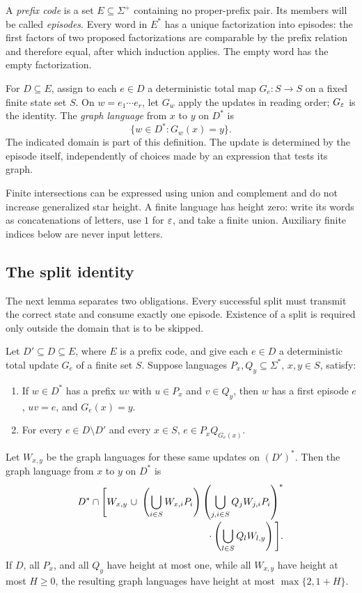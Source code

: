A \emph{prefix code} is a set $E\subseteq\Sigma^+$ containing no
proper-prefix pair. Its members will be called \emph{episodes}. Every
word in $E^*$ has a unique factorization into episodes: the first factors
of two proposed factorizations are comparable by the prefix relation and
therefore equal, after which induction applies. The empty word has the
empty factorization.

For $D\subseteq E$, assign to each $e\in D$ a deterministic total map
$G_e:S\to S$ on a fixed finite state set $S$. On $w=e_1\cdots e_r$,
let $G_w$ apply the updates in reading order; $G_\varepsilon$ is the identity.
The \emph{graph language} from $x$ to $y$ on $D^*$ is
\[
                       \{w\in D^*:G_w(x)=y\}.
\]
The indicated domain is part of this definition. The update is determined
by the episode itself, independently of choices made by an expression
that tests its graph.

Finite intersections can be expressed using union and complement and do
not increase generalized star height. A finite language has height zero:
write its words as concatenations of letters, use $1$ for $\varepsilon$, and
take a finite union. Auxiliary finite indices below are never input
letters.

\subsection{The split identity}

The next lemma separates two obligations. Every successful split must
transmit the correct state and consume exactly one episode. Existence
of a split is required only outside the domain that is to be skipped.

\begin{lemma}\label{alg:split}
Let $D'\subseteq D\subseteq E$, where $E$ is a prefix code, and give
each $e\in D$ a deterministic total update $G_e$ of a finite set $S$.
Suppose languages $P_x,Q_y\subseteq\Sigma^*$, $x,y\in S$, satisfy:
\begin{enumerate}[label=\textup{(\roman*)}]
\item If $w\in D^*$ has a prefix $uv$ with $u\in P_x$ and $v\in Q_y$,
then $w$ has a first episode $e$, $uv=e$, and $G_e(x)=y$.
\item For every $e\in D\setminus D'$ and every $x\in S$,
$e\in P_xQ_{G_e(x)}$.
\end{enumerate}
Let $W_{x,y}$ be the graph languages for these same updates on $(D')^*$.
Then the graph language from $x$ to $y$ on $D^*$ is
\begin{equation}\label{alg:split-formula}
\begin{split}
D^*\cap\Bigg[W_{x,y}\ \cup\ &
 \left(\bigcup_{i\in S}W_{x,i}P_i\right)
 \left(\bigcup_{j,i\in S}Q_jW_{j,i}P_i\right)^*\\[-2pt]
 &\hspace{24mm}\cdot
 \left(\bigcup_{l\in S}Q_lW_{l,y}\right)\Bigg].
\end{split}
\end{equation}
If $D$, all $P_x$, and all $Q_y$ have height at most one, while all
$W_{x,y}$ have height at most $H\ge0$, the resulting graph languages
have height at most $\max\{2,1+H\}$.
\end{lemma}

